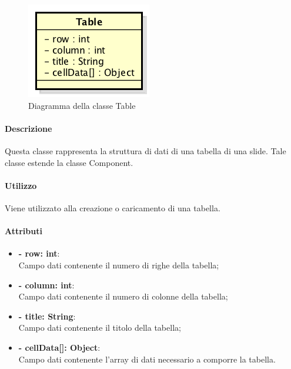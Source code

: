 	\begin{figure}[h]
		\centering
		\includegraphics[width=0.4\linewidth]{img/premi_front_end_model_table}
		\caption[Diagramma della classe Table]{Diagramma della classe Table}
		\label{fig:back_end_premi_model_table}
	\end{figure}
	
	
	\paragraph{Descrizione}
	Questa classe rappresenta la struttura di dati di una tabella di una \gls{slide}. Tale classe estende la classe Component.
	
	\paragraph{Utilizzo}
	Viene utilizzato alla creazione o caricamento di una tabella.
	
	\paragraph{Attributi}
	\begin{itemize}
		\item \textbf{- row: int}:\\
			Campo dati contenente il numero di righe della tabella;
		\item \textbf{- column: int}:\\
			Campo dati contenente il numero di colonne della tabella;
		\item \textbf{- title: String}:\\
			Campo dati contenente il titolo della tabella;
		\item \textbf{- cellData[]: Object}:\\
			Campo dati contenente l'array di dati necessario a comporre la tabella.
	\end{itemize}
